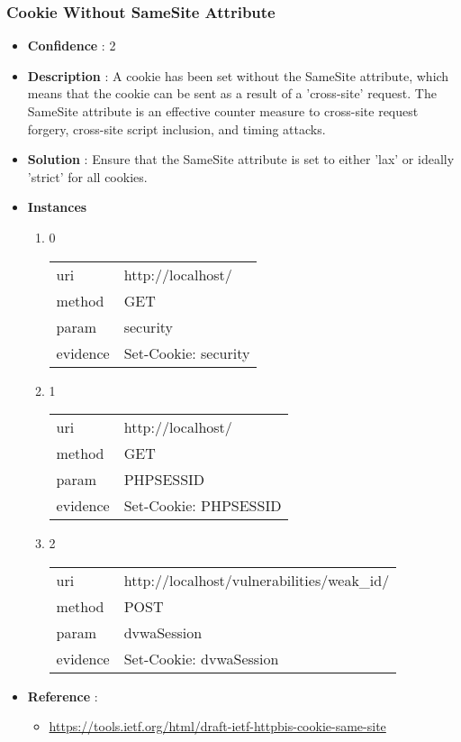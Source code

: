 \documentclass[10pt]{article}
\begin{document}
\subsubsection{Cookie Without SameSite Attribute}
\begin{itemize}
\item[] \textbf{Confidence} : 2
\item[] \textbf{Description} : A cookie has been set without the SameSite attribute, which means that the cookie can be sent as a result of a 'cross-site' request. The SameSite attribute is an effective counter measure to cross-site request forgery, cross-site script inclusion, and timing attacks.
\item[] \textbf{Solution} :  Ensure that the SameSite attribute is set to either 'lax' or ideally 'strict' for all cookies.
\item[] \textbf{Instances}
\begin{enumerate}
\item[] 0
\begin{tabular}{| l | p{12cm}}
uri & http://localhost/ \\
method & GET \\
param & security \\
evidence & Set-Cookie: security \\
\end{tabular}
\item[] 1
\begin{tabular}{| l | p{12cm}}
uri & http://localhost/ \\
method & GET \\
param & PHPSESSID \\
evidence & Set-Cookie: PHPSESSID \\
\end{tabular}
\item[] 2
\begin{tabular}{| l | p{12cm}}
uri & http://localhost/vulnerabilities/weak\_id/ \\
method & POST \\
param & dvwaSession \\
evidence & Set-Cookie: dvwaSession \\
\end{tabular}
\end{enumerate}
\item[] \textbf{Reference} : 
\begin{itemize}
\item \url{https://tools.ietf.org/html/draft-ietf-httpbis-cookie-same-site}
\end{itemize}
\end{itemize}
\end{document}
